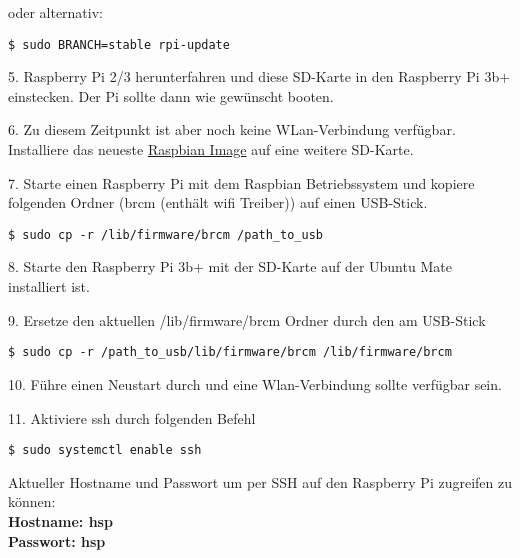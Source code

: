 oder alternativ:\\

\begin{lstlisting}
$ sudo BRANCH=stable rpi-update
\end{lstlisting}
\vspace{-0.8cm}

5. Raspberry Pi 2/3 herunterfahren und diese SD-Karte in den Raspberry Pi 3b+ einstecken. Der Pi sollte dann wie gewünscht booten. 

6. Zu diesem Zeitpunkt ist aber noch keine WLan-Verbindung verfügbar. Installiere das neueste \href{https://www.raspberrypi.org/downloads/raspbian/}{Raspbian Image} auf eine weitere SD-Karte. 

7. Starte einen Raspberry Pi mit dem Raspbian Betriebssystem und kopiere folgenden Ordner (brcm (enthält wifi Treiber)) auf einen USB-Stick.\\

\begin{lstlisting}
$ sudo cp -r /lib/firmware/brcm /path_to_usb
\end{lstlisting}
\vspace{-0.8cm}

8. Starte den Raspberry Pi 3b+ mit der SD-Karte auf der Ubuntu Mate installiert ist. 

9. Ersetze den aktuellen /lib/firmware/brcm Ordner durch den am USB-Stick\\

\begin{lstlisting}
$ sudo cp -r /path_to_usb/lib/firmware/brcm /lib/firmware/brcm
\end{lstlisting}
\vspace{-0.8cm}

10. Führe einen Neustart durch und eine Wlan-Verbindung sollte verfügbar sein.

11. Aktiviere ssh durch folgenden Befehl\\

\begin{lstlisting}
$ sudo systemctl enable ssh
\end{lstlisting}


Aktueller Hostname und Passwort um per SSH auf den Raspberry Pi zugreifen zu können:\\
\textbf{Hostname: hsp}\\
\textbf{Passwort: hsp}







